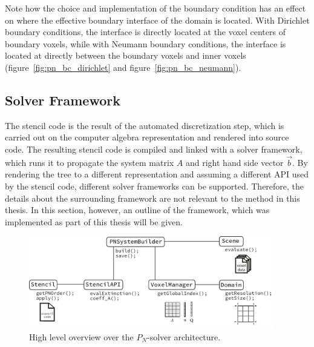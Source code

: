 Note how the choice and implementation of the boundary condition has an effect on where the effective boundary interface of the domain is located. With Dirichlet boundary conditions, the interface is directly located at the voxel centers of boundary voxels, while with Neumann boundary conditions, the interface is located at directly between the boundary voxels and inner voxels (figure~\ref{fig:pn_bc_dirichlet} and figure~\ref{fig:pn_bc_neumann}).

\subsection{Solver Framework}
\label{sec:pn_framework}

The stencil code is the result of the automated discretization step, which is carried out on the computer algebra representation and rendered into source code. The resulting stencil code is compiled and linked with a solver framework, which runs it to propagate the system matrix $A$ and right hand side vector $\vec{b}$. By rendering the tree to a different representation and assuming a different API used by the stencil code, different solver frameworks can be supported.
Therefore, the details about the surrounding framework are not relevant to the method in this thesis. In this section, however, an outline of the framework, which was implemented as part of this thesis will be given.
\begin{figure}[h]
\centering
\includegraphics[width=0.95\textwidth]{04_pn_method/figures/fig_pn_solver_architecture.pdf}
\caption{High level overview over the $P_N$-solver architecture.}
\label{fig:pn_classes}
\end{figure}

